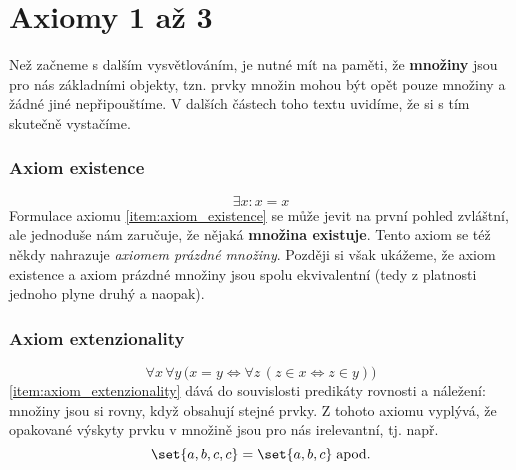 \section{Axiomy 1 až 3}\label{sec:axiomy_1_az_3}
Než začneme s dalším vysvětlováním, je nutné mít na paměti, že \textbf{množiny} jsou pro nás základními objekty, tzn. prvky množin mohou být opět pouze množiny a žádné jiné nepřipouštíme. V dalších částech toho textu uvidíme, že si s tím skutečně vystačíme.
\subsubsection{Axiom existence}
\begin{equation*}
    \exists x: x=x
\end{equation*}
Formulace axiomu \ref{item:axiom_existence} se může jevit na první pohled zvláštní, ale jednoduše nám zaručuje, že nějaká \textbf{množina existuje}. Tento axiom se též někdy nahrazuje \emph{axiomem prázdné množiny}. Později si však ukážeme, že axiom existence a axiom prázdné množiny jsou spolu ekvivalentní (tedy z platnosti jednoho plyne druhý a naopak).

\subsubsection{Axiom extenzionality}
\begin{equation*}
    \forall x\,\forall y\,\big(x=y \iff \forall z\,(z\in x \iff z\in y)\big)
\end{equation*}
\ref{item:axiom_extenzionality} dává do souvislosti predikáty rovnosti a náležení: množiny jsou si rovny, když obsahují stejné prvky. Z tohoto axiomu vyplývá, že opakované výskyty prvku v množině jsou pro nás irelevantní, tj. např.
\begin{equation*}
    \set{a,b,c,c}=\set{a,b,c}\;\text{apod.}
\end{equation*}

